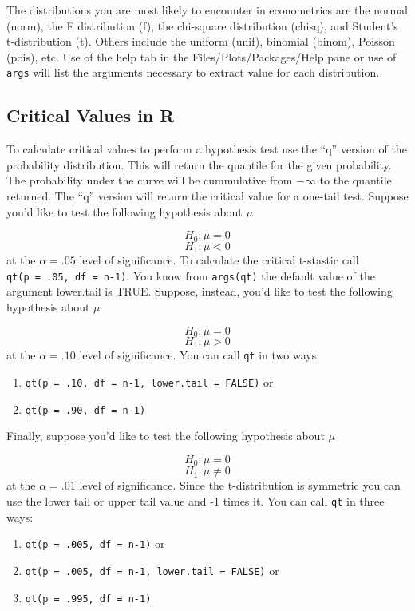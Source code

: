 \documentclass[]{book}
\providecommand{\tightlist}{%
  \setlength{\itemsep}{0pt}\setlength{\parskip}{0pt}}
\begin{document}
The distributions you are most likely to encounter in econometrics are the normal (norm), the F distribution (f), the chi-square distribution (chisq), and Student's t-distribution (t). Others include the uniform (unif), binomial (binom), Poisson (pois), etc. Use of the help tab in the Files/Plots/Packages/Help pane or use of \texttt{args} will list the arguments necessary to extract value for each distribution.

\hypertarget{critical-values-in-r}{%
\subsection{Critical Values in R}\label{critical-values-in-r}}

To calculate critical values to perform a hypothesis test use the ``q'' version of the probability distribution. This will return the quantile for the given probability. The probability under the curve will be cummulative from \(-\infty\) to the quantile returned. The ``q'' version will return the critical value for a one-tail test. Suppose you'd like to test the following hypothesis about \(\mu\):

\[H_0:\mu=0\]
\[H_1:\mu<0\]
at the \(\alpha=.05\) level of significance. To calculate the critical t-stastic call \texttt{qt(p\ =\ .05,\ df\ =\ n-1)}. You know from \texttt{args(qt)} the default value of the argument lower.tail is TRUE. Suppose, instead, you'd like to test the following hypothesis about \(\mu\)

\[H_0:\mu=0\]
\[H_1:\mu>0\]
at the \(\alpha = .10\) level of significance. You can call \texttt{qt} in two ways:

\begin{enumerate}
\def\labelenumi{\arabic{enumi}.}
\tightlist
\item
  \texttt{qt(p\ =\ .10,\ df\ =\ n-1,\ lower.tail\ =\ FALSE)} or
\item
  \texttt{qt(p\ =\ .90,\ df\ =\ n-1)}
\end{enumerate}

Finally, suppose you'd like to test the following hypothesis about \(\mu\)

\[H_0:\mu=0\]
\[H_1:\mu\ne0\]
at the \(\alpha=.01\) level of significance. Since the t-distribution is symmetric you can use the lower tail or upper tail value and -1 times it. You can call \texttt{qt} in three ways:

\begin{enumerate}
\def\labelenumi{\arabic{enumi}.}
\tightlist
\item
  \texttt{qt(p\ =\ .005,\ df\ =\ n-1)} or
\item
  \texttt{qt(p\ =\ .005,\ df\ =\ n-1,\ lower.tail\ =\ FALSE)} or
\item
  \texttt{qt(p\ =\ .995,\ df\ =\ n-1)}
\end{enumerate}
\end{document}

